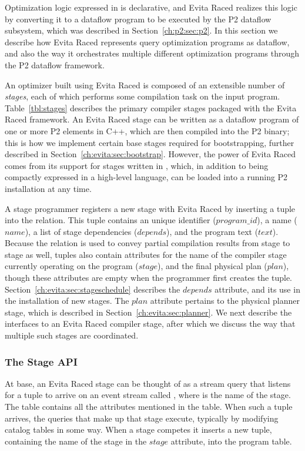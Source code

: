 Optimization logic expressed in \OVERLOG is declarative, and Evita Raced
realizes this logic by converting it to a dataflow program to be executed by
the P2 dataflow subsystem, which was described in Section~\ref{ch:p2:sec:p2}.
In this section we describe how Evita Raced represents query optimization
programs as dataflow, and also the way it orchestrates multiple different
optimization programs through the P2 dataflow framework.

An optimizer built using Evita Raced is composed of an extensible number of
{\em stages}, each of which performs some compilation task on the input
program.  Table~\ref{tbl:stages} describes the primary compiler stages packaged
with the Evita Raced framework.  An Evita Raced stage can be written as a
dataflow program of one or more P2 elements in C++, which are then compiled
into the P2 binary; this is how we implement certain base stages required for
bootstrapping, further described in Section~\ref{ch:evita:sec:bootstrap}.  However,
the power of Evita Raced comes from its support for stages written in \OVERLOG,
which, in addition to being compactly expressed in a high-level language, can
be loaded into a running P2 installation at any time.

A stage programmer registers a new stage with Evita Raced by inserting a tuple
into the  relation.  This tuple contains an unique identifier
($program\_id$), a name ($name$), a list of stage dependencies ($depends$), and
the program text ($text$).  Because the  relation is used to convey
partial compilation results from stage to stage as well,  tuples
also contain attributes for the name of the compiler stage currently operating
on the program ($stage$), and the final physical plan ($plan$), though these
attributes are empty when the programmer first creates the tuple.
Section~\ref{ch:evita:sec:stageschedule} describes the $depends$ attribute, and
its use in the installation of new stages.  The $plan$ attribute pertains to
the physical planner stage, which is described in
Section~\ref{ch:evita:sec:planner}.  We next describe the interfaces to an
Evita Raced compiler stage, after which we discuss the way that multiple such
stages are coordinated.

\subsubsection{The Stage API}

At base, an Evita Raced stage can be thought of as a stream query that listens
for a tuple to arrive on an event stream called ,
where  is the name of the stage.  The 
table contains all the attributes mentioned in the  table.  When
such a tuple arrives, the queries that make up that stage execute, typically by
modifying catalog tables in some way.  When a stage competes it inserts a new
 tuple, containing the name of the stage in the $stage$ attribute,
into the program table.

